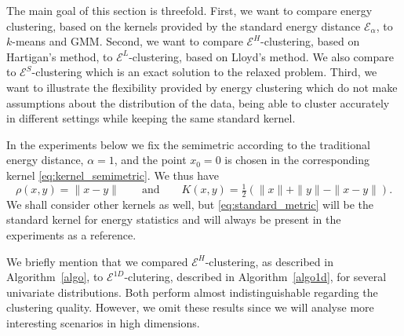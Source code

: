 \documentclass[aps,preprint,nofootinbib,floatfix]{revtex4-1}
\newcommand\kk{K}
\begin{document}


The main goal of this section is threefold. First, we want to compare
energy clustering, based on the kernels provided by the standard energy
distance $\mathcal{E}_\alpha$, to $k$-means and GMM. Second, we want
to compare $\mathcal{E}^H$-clustering, based on Hartigan's method, to
$\mathcal{E}^L$-clustering, based on Lloyd's method. We also compare
to $\mathcal{E}^S$-clustering
which is an exact solution to the relaxed problem.
Third, we want to illustrate the flexibility
provided by energy clustering which do not make assumptions about the
distribution of the data, being able to cluster accurately in different
settings while keeping the same standard kernel.

In the experiments below we fix the semimetric 
according to the traditional energy distance, $\alpha=1$, and
the point $x_0=0$ is chosen in the corresponding kernel  
\eqref{eq:kernel_semimetric}. We thus have
\begin{equation}
\label{eq:standard_metric}
\rho(x,y) = \| x-y\| \qquad \mbox{and} \qquad \kk(x,y) = 
\tfrac{1}{2}\left( \| x \| + \| y \| - \| x-y \| \right).
\end{equation}
We shall consider other kernels as well, 
but \eqref{eq:standard_metric} will be the
standard kernel for energy statistics and will always be present in the
experiments as a reference.

We briefly mention that we compared $\mathcal{E}^H$-clustering,
as described in Algorithm~\ref{algo}, to
$\mathcal{E}^{1D}$-clutering, described in Algorithm~\ref{algo1d}, 
for several univariate distributions.
Both perform almost indistinguishable regarding the clustering quality.
However, we omit these results since we will analyse more interesting 
scenarios in high dimensions.
\end{document}
